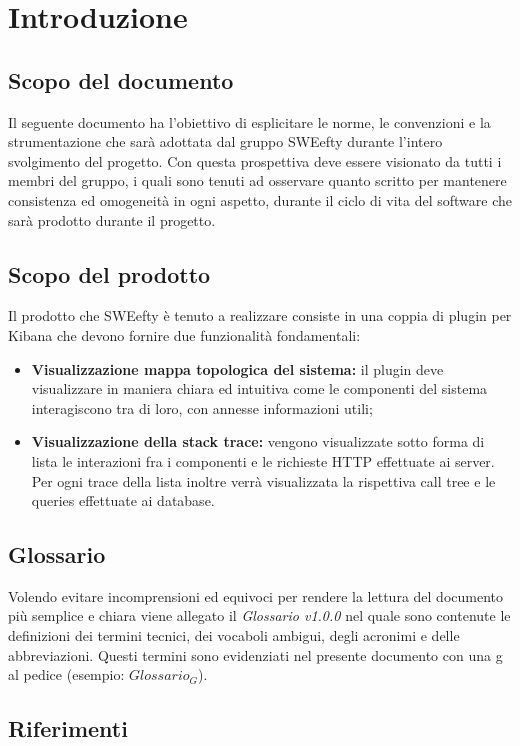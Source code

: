 \section{Introduzione}
\subsection{Scopo del documento}
Il seguente documento ha l'obiettivo di esplicitare le norme, le convenzioni e la strumentazione che sarà adottata dal gruppo SWEefty durante l'intero svolgimento del progetto. Con questa prospettiva deve essere visionato da tutti i membri del gruppo, i quali sono tenuti ad osservare quanto scritto per mantenere consistenza ed omogeneità in ogni aspetto, durante il ciclo di vita del software che sarà prodotto durante il progetto.
\subsection{Scopo del prodotto}
	Il prodotto che SWEefty è tenuto a realizzare consiste in una coppia di plugin per Kibana che devono fornire due funzionalità fondamentali:
	\begin{itemize}
		\item \textbf{Visualizzazione mappa topologica del sistema:} il plugin deve visualizzare in maniera chiara ed intuitiva come le componenti del sistema interagiscono tra di loro, con annesse informazioni utili;
		\item \textbf{Visualizzazione della stack trace:} vengono visualizzate sotto forma di lista le interazioni fra i componenti e le richieste HTTP effettuate ai server. Per ogni trace della lista inoltre verrà visualizzata la rispettiva call tree e le queries effettuate ai database.
	\end{itemize}

\subsection{Glossario}
	Volendo evitare incomprensioni  ed equivoci per rendere la lettura del documento più semplice e chiara viene allegato il \emph{Glossario v1.0.0} nel quale sono contenute le definizioni dei termini tecnici, dei vocaboli ambigui, degli acronimi e delle abbreviazioni. Questi termini sono evidenziati nel presente documento con una g al pedice (esempio: $Glossario_{G}$).

\subsection{Riferimenti}

